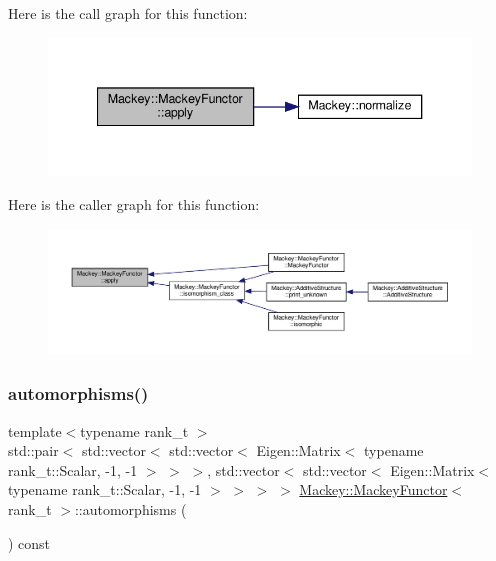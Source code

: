 Here is the call graph for this function\+:\nopagebreak
\begin{figure}[H]
\begin{center}
\leavevmode
\includegraphics[width=340pt]{classMackey_1_1MackeyFunctor_a24b7b8ce61be39ea51432d0d3737a55f_cgraph}
\end{center}
\end{figure}
Here is the caller graph for this function\+:\nopagebreak
\begin{figure}[H]
\begin{center}
\leavevmode
\includegraphics[width=350pt]{classMackey_1_1MackeyFunctor_a24b7b8ce61be39ea51432d0d3737a55f_icgraph}
\end{center}
\end{figure}
\mbox{\label{classMackey_1_1MackeyFunctor_a454e5488d62aa1e8d5ff4df71aeecfa1}} 
\subsubsection{\texorpdfstring{automorphisms()}{automorphisms()}}
{\footnotesize\ttfamily template$<$typename rank\+\_\+t $>$ \\
std\+::pair$<$ std\+::vector$<$ std\+::vector$<$ Eigen\+::\+Matrix$<$ typename rank\+\_\+t\+::\+Scalar, -\/1, -\/1 $>$ $>$ $>$, std\+::vector$<$ std\+::vector$<$ Eigen\+::\+Matrix$<$ typename rank\+\_\+t\+::\+Scalar, -\/1, -\/1 $>$ $>$ $>$ $>$ \hyperlink{classMackey_1_1MackeyFunctor}{Mackey\+::\+Mackey\+Functor}$<$ rank\+\_\+t $>$\+::automorphisms (\begin{DoxyParamCaption}{ }\end{DoxyParamCaption}) const}



